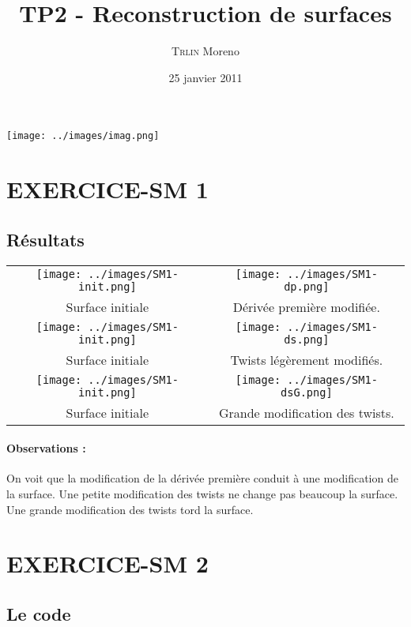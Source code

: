 \documentclass[11pt,a4paper]{article}
\title{
  \huge{\bf TP2 - Reconstruction de surfaces}
}
\author{
    \textsc{Trlin} Moreno \\
}
\date{25 janvier 2011}
\begin{document}
 \maketitle
  \begin{center}
   \texttt{[image: ../images/imag.png]}

  \end{center}
 \tableofcontents

\section{EXERCICE-SM 1}
\subsection{Résultats}

\begin{tabular}{|c|c|}
\hline
\texttt{[image: ../images/SM1-init.png]} & \texttt{[image: ../images/SM1-dp.png]} \\
Surface initiale                         & Dérivée première modifiée. \\
\hline
\texttt{[image: ../images/SM1-init.png]} & \texttt{[image: ../images/SM1-ds.png]} \\
Surface initiale                         & Twists légèrement modifiés. \\
\hline
\texttt{[image: ../images/SM1-init.png]} & \texttt{[image: ../images/SM1-dsG.png]} \\
Surface initiale                         & Grande modification des twists. \\
\hline
\end{tabular}

\paragraph{Observations :} On voit que la modification de la dérivée première conduit à une modification de
la surface. Une petite modification des twists ne change pas beaucoup la surface. Une grande modification
des twists tord la surface.

\section{EXERCICE-SM 2}
\subsection{Le code}
\end{document}
